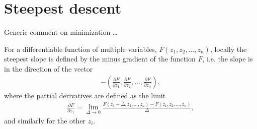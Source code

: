 \documentclass[letterpaper,10pt,english]{jupyterBook}
\begin{document}
\section{Steepest descent}
\label{\detokenize{docs/backprop:steepest-descent}}
\sphinxAtStartPar
Generic comment on minimization …

\sphinxAtStartPar
For a differentiable function of multiple variables, \( F (z_1, z_2, ..., z_n) \), locally the steepest slope is defined by the minus gradient of the function \( F \), i.e. the slope is in the direction of the vector
\begin{equation*}
\begin{split}-\left (\frac{\partial F}{\partial z_1}, \frac{\partial F}{\partial z_2}, ..., 
\frac{\partial F}{\partial z_n} \right ), \end{split}
\end{equation*}
\sphinxAtStartPar
where the partial derivatives are defined as the limit
\begin{equation*}
\begin{split}\frac{\partial F}{\partial z_1} =  \lim _ {\Delta \to 0} \frac {F (z_1 + \Delta, z_2, ..., z_n) -F (z_1, z_2, ..., z_n)} { \Delta}, \end{split}
\end{equation*}
\sphinxAtStartPar
and similarly for the other \( z_i \).
\end{document}

